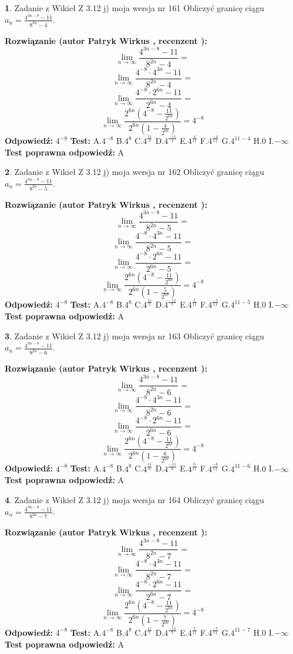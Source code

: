 \documentclass[12pt, a4paper]{article}
\theoremstyle{definition} %
\newtheorem{zad}{}
\newcommand{\zadStart}[1]{\begin{zad}#1\newline}
\newcommand{\zadStop}{\end{zad}}
\newcommand{\rozwStart}[2]{\noindent \textbf{Rozwiązanie (autor #1 , recenzent #2): }\newline}
\newcommand{\rozwStop}{\newline}
\newcommand{\odpStart}{\noindent \textbf{Odpowiedź:}\newline}
\newcommand{\odpStop}{\newline}
\newcommand{\testStart}{\noindent \textbf{Test:}\newline}
\newcommand{\testStop}{\newline}
\newcommand{\kluczStart}{\noindent \textbf{Test poprawna odpowiedź:}\newline}
\newcommand{\kluczStop}{\newline}
\begin{document}
\zadStart{Zadanie z Wikieł Z 3.12 j) moja wersja nr 161}
Obliczyć granicę ciągu $a_{n}=\frac{4^{3n-8}-11}{8^{2n}-4}$.
\zadStop
\rozwStart{Patryk Wirkus}{}
$$\lim\limits_{n\to\infty}\frac{4^{3n-8}-11}{8^{2n}-4}=$$
$$\lim\limits_{n\to\infty}\frac{4^{-8} \cdot 4^{3n}-11}{8^{2n}-4}=$$
$$\lim\limits_{n\to\infty}\frac{4^{-8} \cdot 2^{6n}-11}{2^{6n}-4}=$$
$$\lim\limits_{n\to\infty}\frac{2^{6n}(4^{-8} - \frac{11}{2^{6n}})}{2^{6n}(1-\frac{4}{2^{6n}})}= 4^{-8}$$
\rozwStop
\odpStart
$4^{-8}$
\odpStop
\testStart
A.$4^{-8}$
B.$4^{8}$
C.$4^{\frac{11}{4}}$
D.$4^{\frac{-11}{4}}$
E.$4^{\frac{4}{11}}$
F.$4^{\frac{-4}{11}}$
G.$4^{11-4}$
H.$0$
I.$-\infty$
\testStop
\kluczStart
A
\kluczStop



\zadStart{Zadanie z Wikieł Z 3.12 j) moja wersja nr 162}
Obliczyć granicę ciągu $a_{n}=\frac{4^{3n-8}-11}{8^{2n}-5}$.
\zadStop
\rozwStart{Patryk Wirkus}{}
$$\lim\limits_{n\to\infty}\frac{4^{3n-8}-11}{8^{2n}-5}=$$
$$\lim\limits_{n\to\infty}\frac{4^{-8} \cdot 4^{3n}-11}{8^{2n}-5}=$$
$$\lim\limits_{n\to\infty}\frac{4^{-8} \cdot 2^{6n}-11}{2^{6n}-5}=$$
$$\lim\limits_{n\to\infty}\frac{2^{6n}(4^{-8} - \frac{11}{2^{6n}})}{2^{6n}(1-\frac{5}{2^{6n}})}= 4^{-8}$$
\rozwStop
\odpStart
$4^{-8}$
\odpStop
\testStart
A.$4^{-8}$
B.$4^{8}$
C.$4^{\frac{11}{5}}$
D.$4^{\frac{-11}{5}}$
E.$4^{\frac{5}{11}}$
F.$4^{\frac{-5}{11}}$
G.$4^{11-5}$
H.$0$
I.$-\infty$
\testStop
\kluczStart
A
\kluczStop



\zadStart{Zadanie z Wikieł Z 3.12 j) moja wersja nr 163}
Obliczyć granicę ciągu $a_{n}=\frac{4^{3n-8}-11}{8^{2n}-6}$.
\zadStop
\rozwStart{Patryk Wirkus}{}
$$\lim\limits_{n\to\infty}\frac{4^{3n-8}-11}{8^{2n}-6}=$$
$$\lim\limits_{n\to\infty}\frac{4^{-8} \cdot 4^{3n}-11}{8^{2n}-6}=$$
$$\lim\limits_{n\to\infty}\frac{4^{-8} \cdot 2^{6n}-11}{2^{6n}-6}=$$
$$\lim\limits_{n\to\infty}\frac{2^{6n}(4^{-8} - \frac{11}{2^{6n}})}{2^{6n}(1-\frac{6}{2^{6n}})}= 4^{-8}$$
\rozwStop
\odpStart
$4^{-8}$
\odpStop
\testStart
A.$4^{-8}$
B.$4^{8}$
C.$4^{\frac{11}{6}}$
D.$4^{\frac{-11}{6}}$
E.$4^{\frac{6}{11}}$
F.$4^{\frac{-6}{11}}$
G.$4^{11-6}$
H.$0$
I.$-\infty$
\testStop
\kluczStart
A
\kluczStop



\zadStart{Zadanie z Wikieł Z 3.12 j) moja wersja nr 164}
Obliczyć granicę ciągu $a_{n}=\frac{4^{3n-8}-11}{8^{2n}-7}$.
\zadStop
\rozwStart{Patryk Wirkus}{}
$$\lim\limits_{n\to\infty}\frac{4^{3n-8}-11}{8^{2n}-7}=$$
$$\lim\limits_{n\to\infty}\frac{4^{-8} \cdot 4^{3n}-11}{8^{2n}-7}=$$
$$\lim\limits_{n\to\infty}\frac{4^{-8} \cdot 2^{6n}-11}{2^{6n}-7}=$$
$$\lim\limits_{n\to\infty}\frac{2^{6n}(4^{-8} - \frac{11}{2^{6n}})}{2^{6n}(1-\frac{7}{2^{6n}})}= 4^{-8}$$
\rozwStop
\odpStart
$4^{-8}$
\odpStop
\testStart
A.$4^{-8}$
B.$4^{8}$
C.$4^{\frac{11}{7}}$
D.$4^{\frac{-11}{7}}$
E.$4^{\frac{7}{11}}$
F.$4^{\frac{-7}{11}}$
G.$4^{11-7}$
H.$0$
I.$-\infty$
\testStop
\kluczStart
A
\kluczStop
\end{document}
